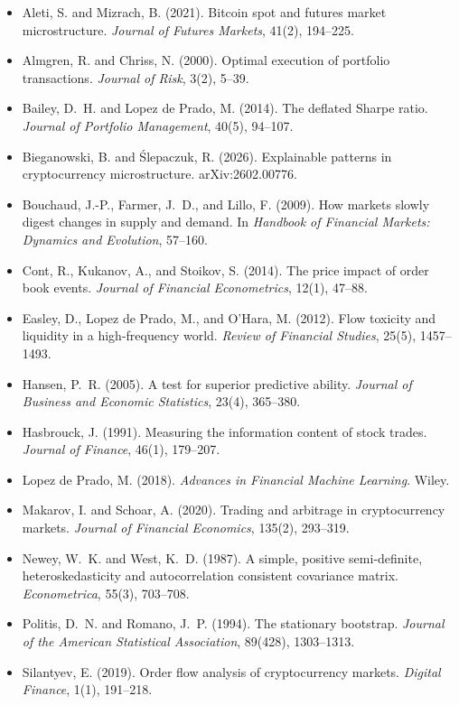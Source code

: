 ﻿\documentclass[11pt,a4paper]{article}
\begin{document}
\begin{itemize}
    \setlength{\itemsep}{0.2em}
    \item Aleti, S. and Mizrach, B. (2021). Bitcoin spot and futures market microstructure. \textit{Journal of Futures Markets}, 41(2), 194--225.
    \item Almgren, R. and Chriss, N. (2000). Optimal execution of portfolio transactions. \textit{Journal of Risk}, 3(2), 5--39.
    \item Bailey, D.~H. and Lopez de Prado, M. (2014). The deflated Sharpe ratio. \textit{Journal of Portfolio Management}, 40(5), 94--107.
    \item Bieganowski, B. and Ślepaczuk, R. (2026). Explainable patterns in cryptocurrency microstructure. arXiv:2602.00776.
    \item Bouchaud, J.-P., Farmer, J.~D., and Lillo, F. (2009). How markets slowly digest changes in supply and demand. In \textit{Handbook of Financial Markets: Dynamics and Evolution}, 57--160.
    \item Cont, R., Kukanov, A., and Stoikov, S. (2014). The price impact of order book events. \textit{Journal of Financial Econometrics}, 12(1), 47--88.
    \item Easley, D., Lopez de Prado, M., and O'Hara, M. (2012). Flow toxicity and liquidity in a high-frequency world. \textit{Review of Financial Studies}, 25(5), 1457--1493.
    \item Hansen, P.~R. (2005). A test for superior predictive ability. \textit{Journal of Business and Economic Statistics}, 23(4), 365--380.
    \item Hasbrouck, J. (1991). Measuring the information content of stock trades. \textit{Journal of Finance}, 46(1), 179--207.
    \item Lopez de Prado, M. (2018). \textit{Advances in Financial Machine Learning}. Wiley.
    \item Makarov, I. and Schoar, A. (2020). Trading and arbitrage in cryptocurrency markets. \textit{Journal of Financial Economics}, 135(2), 293--319.
    \item Newey, W.~K. and West, K.~D. (1987). A simple, positive semi-definite, heteroskedasticity and autocorrelation consistent covariance matrix. \textit{Econometrica}, 55(3), 703--708.
    \item Politis, D.~N. and Romano, J.~P. (1994). The stationary bootstrap. \textit{Journal of the American Statistical Association}, 89(428), 1303--1313.
    \item Silantyev, E. (2019). Order flow analysis of cryptocurrency markets. \textit{Digital Finance}, 1(1), 191--218.
\end{itemize}
\end{document}
